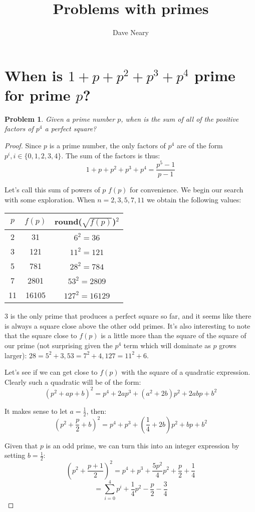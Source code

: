 \documentclass{article}
\newtheorem*{problem}{Problem}
\begin{document}
\title{Problems with primes}
\author{Dave Neary}

\section{When is $1+p+p^2+p^3+p^4$ prime for prime $p$?}

\begin{problem}
	Given a prime number $p$, when is the sum of all of the positive factors of $p^4$
	a perfect square?
\end{problem}

\begin{proof}
	Since $p$ is a prime number, the only factors of $p^4$ are of the form
	$p^i, i \in \{0,1,2,3,4\}$. The sum of the factors is thus:
	\[ 1+p+p^2+p^3+p^4 = \frac{p^5-1}{p-1} \]
	
	Let's call this sum of powers of $p$ $f(p)$ for convenience. We begin our search
	with some exploration. When $n=2, 3, 5, 7, 11$ we obtain the following values:
	\begin{center}
		\begin{tabular}{ |c|c|c| }
			\hline
			$p$ & $f(p)$ & round($\sqrt{f(p)}$)$^2$ \\
			\hline
		2 & 31 & $6^2=36$ \\
		3 & 121 & $11^2=121$ \\
		5 & 781 & $28^2=784$ \\ 
		7 & 2801 & $53^2=2809$ \\ 
		11 & 16105 & $127^2=16129$ \\ 
		\hline 
		\end{tabular}
	\end{center}

	3 is the only prime that produces a perfect square so far, and it seems like there
	is always a square close above the other odd primes. It's also interesting to note
	that the square close to $f(p)$ is a little more than the square of the square of our
	prime (not surprising given the $p^4$ term which will dominate as $p$ grows larger):
	$28 = 5^2 + 3, 53 = 7^2 + 4, 127=11^2 + 6$.

	Let's see if we can get close to $f(p)$ with the square of a quadratic expression.
	Clearly such a quadratic will be of the form:
	\[ (p^2 + ap + b)^2 = p^4 + 2ap^3 + (a^2+2b)p^2 + 2abp + b^2\]

	It makes sense to let $a=\frac{1}{2}$, then:
	\[(p^2 + \frac{p}{2} + b)^2 = p^4 + p^3 + (\frac{1}{4}+2b)p^2 + bp + b^2 \]

	Given that $p$ is an odd prime, we can turn this into an integer expression by
	setting $b=\frac{1}{2}$: 
	\[ (p^2 + \frac{p+1}{2})^2 = p^4 + p^3 + \frac{5p^2}{4}p^2 + \frac{p}{2} + \frac{1}{4} \]
	\[ = \sum_{i=0}^4 p^i + \frac{1}{4}p^2 - \frac{p}{2} - \frac{3}{4} \]


\end{proof}
\end{document}
